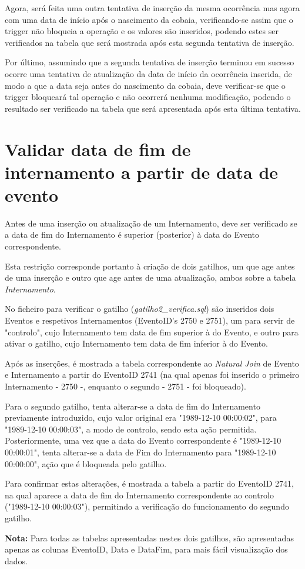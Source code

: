 \documentclass[article, a4paper, 12pt, oneside]{memoir}
\begin{document}
Agora, será feita uma outra tentativa de inserção da mesma ocorrência mas agora com uma data de início após o nascimento da cobaia, verificando-se assim que o trigger não bloqueia a operação e os valores são inseridos, podendo estes ser verificados na tabela que será mostrada após esta segunda tentativa de inserção.

Por último, assumindo que a segunda tentativa de inserção terminou em sucesso ocorre uma tentativa de atualização da data de início da ocorrência inserida, de modo a que a data seja antes do nascimento da cobaia, deve verificar-se que o trigger bloqueará tal operação e não ocorrerá nenhuma modificação, podendo o resultado ser verificado na tabela que será apresentada após esta última tentativa.

\section{Validar data de fim de internamento a partir de data de evento}
Antes de uma inserção ou atualização de um Internamento, deve ser verificado se a data de fim do Internamento é superior (posterior) à data do Evento correspondente.

Esta restrição corresponde portanto à criação de dois gatilhos, um que age antes de uma inserção e outro que age antes de uma atualização, ambos sobre a tabela \emph{Internamento}.

No ficheiro para verificar o gatilho (\textit{gatilho2\_verifica.sql}) são inseridos dois Eventos e respetivos Internamentos (EventoID's 2750 e 2751), um para servir de "controlo", cujo Internamento tem data de fim superior à do Evento, e outro para ativar o gatilho, cujo Internamento tem data de fim inferior à do Evento.

Após as inserções, é mostrada a tabela correspondente ao \textit{Natural Join} de Evento e Internamento a partir do EventoID 2741 (na qual apenas foi inserido o primeiro Internamento - 2750 -, enquanto o segundo - 2751 - foi bloqueado).

Para o segundo gatilho, tenta alterar-se a data de fim do Internamento previamente introduzido, cujo valor original era "1989-12-10 00:00:02", para "1989-12-10 00:00:03", a modo de controlo, sendo esta ação permitida. Posteriormente, uma vez que a data do Evento correspondente é "1989-12-10 00:00:01", tenta alterar-se a data de Fim do Internamento para "1989-12-10 00:00:00", ação que é bloqueada pelo gatilho.

Para confirmar estas alterações, é mostrada a tabela a partir do EventoID 2741, na qual aparece a data de fim do Internamento correspondente ao controlo ("1989-12-10 00:00:03"), permitindo a verificação do funcionamento do segundo gatilho.

\textbf{Nota:} Para todas as tabelas apresentadas nestes dois gatilhos, são apresentadas apenas as colunas EventoID, Data e DataFim, para mais fácil visualização dos dados.
\end{document}
